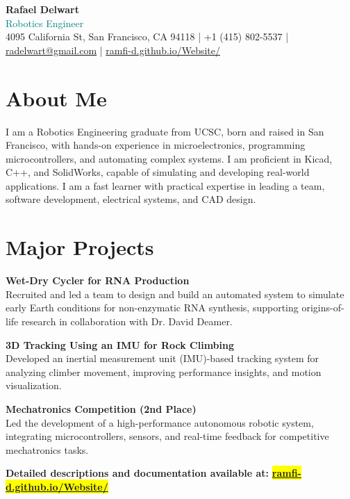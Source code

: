 \documentclass[a4paper,9pt]{article}
\begin{document}
\begin{center}
    {\Large \textbf{Rafael Delwart}} \\
    {\small \textcolor{teal}{Robotics Engineer}} \\
    \vspace{0.3em}
    {\footnotesize
        4095 California St, San Francisco, CA 94118 \quad | \quad
        +1 (415) 802-5537 \quad | \quad
        \href{mailto:radelwart@gmail.com}{radelwart@gmail.com} \quad | \quad
        \href{https://ramfi-d.github.io/Website/}{ramfi-d.github.io/Website/}
    }
    \vspace{0.8em}
\end{center}

\section*{About Me}
 I am a Robotics Engineering graduate from UCSC, born and raised in San Francisco, with hands-on experience in microelectronics, programming microcontrollers, and automating complex systems. I am proficient in Kicad, C++, and SolidWorks, capable of simulating and developing real-world applications. I am a fast learner with practical expertise in leading a team, software development, electrical systems, and CAD design.\normalsize

\section*{Major Projects}

\small 

\textbf{Wet-Dry Cycler for RNA Production} \\
Recruited and led a team to design and build an automated system to simulate early Earth conditions for non-enzymatic RNA synthesis, supporting origins-of-life research in collaboration with Dr. David Deamer.

\textbf{3D Tracking Using an IMU for Rock Climbing} \\
Developed an inertial measurement unit (IMU)-based tracking system for analyzing climber movement, improving performance insights, and motion visualization.

\textbf{Mechatronics Competition (2nd Place)} \\
Led the development of a high-performance autonomous robotic system, integrating microcontrollers, sensors, and real-time feedback for competitive mechatronics tasks.

\textbf{Detailed descriptions and documentation available at: }\colorbox{yellow}{\href{https://ramfi-d.github.io/Website/}{\textbf{ramfi-d.github.io/Website/}}}
\end{document}
